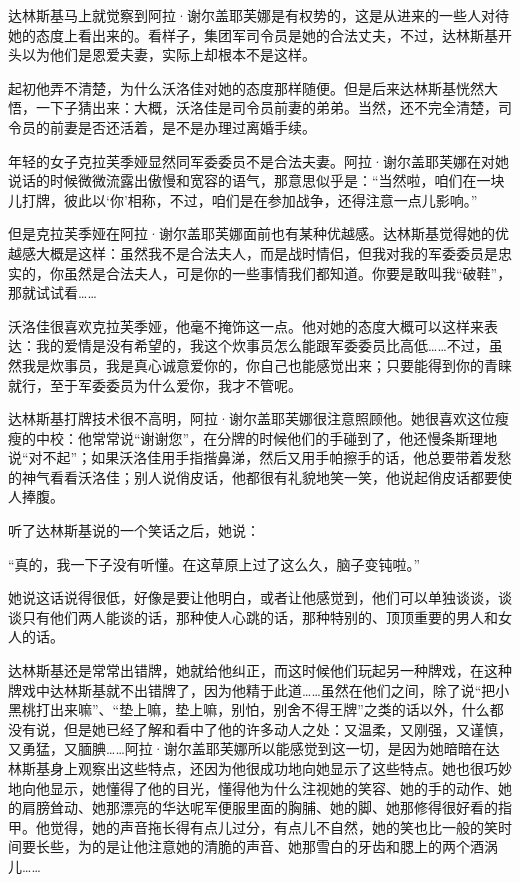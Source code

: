 达林斯基马上就觉察到阿拉·谢尔盖耶芙娜是有权势的，这是从进来的一些人对待她的态度上看出来的。看样子，集团军司令员是她的合法丈夫，不过，达林斯基开头以为他们是恩爱夫妻，实际上却根本不是这样。

起初他弄不清楚，为什么沃洛佳对她的态度那样随便。但是后来达林斯基恍然大悟，一下子猜出来：大概，沃洛佳是司令员前妻的弟弟。当然，还不完全清楚，司令员的前妻是否还活着，是不是办理过离婚手续。

年轻的女子克拉芙季娅显然同军委委员不是合法夫妻。阿拉·谢尔盖耶芙娜在对她说话的时候微微流露出傲慢和宽容的语气，那意思似乎是：“当然啦，咱们在一块儿打牌，彼此以‘你’相称，不过，咱们是在参加战争，还得注意一点儿影响。”

但是克拉芙季娅在阿拉·谢尔盖耶芙娜面前也有某种优越感。达林斯基觉得她的优越感大概是这样：虽然我不是合法夫人，而是战时情侣，但我对我的军委委员是忠实的，你虽然是合法夫人，可是你的一些事情我们都知道。你要是敢叫我“破鞋”，那就试试看……

沃洛佳很喜欢克拉芙季娅，他毫不掩饰这一点。他对她的态度大概可以这样来表达：我的爱情是没有希望的，我这个炊事员怎么能跟军委委员比高低……不过，虽然我是炊事员，我是真心诚意爱你的，你自己也能感觉出来；只要能得到你的青睐就行，至于军委委员为什么爱你，我才不管呢。

达林斯基打牌技术很不高明，阿拉·谢尔盖耶芙娜很注意照顾他。她很喜欢这位瘦瘦的中校：他常常说“谢谢您”，在分牌的时候他们的手碰到了，他还慢条斯理地说“对不起”；如果沃洛佳用手指揩鼻涕，然后又用手帕擦手的话，他总要带着发愁的神气看看沃洛佳；别人说俏皮话，他都很有礼貌地笑一笑，他说起俏皮话都要使人捧腹。

听了达林斯基说的一个笑话之后，她说：

“真的，我一下子没有听懂。在这草原上过了这么久，脑子变钝啦。”

她说这话说得很低，好像是要让他明白，或者让他感觉到，他们可以单独谈谈，谈谈只有他们两人能谈的话，那种使人心跳的话，那种特别的、顶顶重要的男人和女人的话。

达林斯基还是常常出错牌，她就给他纠正，而这时候他们玩起另一种牌戏，在这种牌戏中达林斯基就不出错牌了，因为他精于此道……虽然在他们之间，除了说“把小黑桃打出来嘛”、“垫上嘛，垫上嘛，别怕，别舍不得王牌”之类的话以外，什么都没有说，但是她已经了解和看中了他的许多动人之处：又温柔，又刚强，又谨慎，又勇猛，又腼腆……阿拉·谢尔盖耶芙娜所以能感觉到这一切，是因为她暗暗在达林斯基身上观察出这些特点，还因为他很成功地向她显示了这些特点。她也很巧妙地向他显示，她懂得了他的目光，懂得他为什么注视她的笑容、她的手的动作、她的肩膀耸动、她那漂亮的华达呢军便服里面的胸脯、她的脚、她那修得很好看的指甲。他觉得，她的声音拖长得有点儿过分，有点儿不自然，她的笑也比一般的笑时间要长些，为的是让他注意她的清脆的声音、她那雪白的牙齿和腮上的两个酒涡儿……

